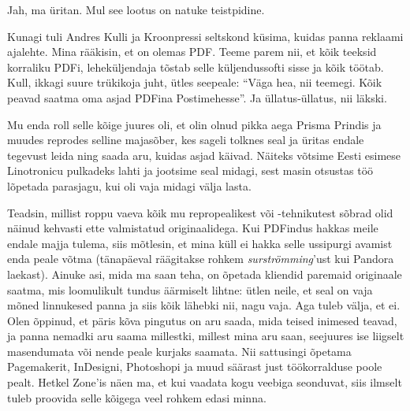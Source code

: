 Jah, ma üritan. Mul see lootus on natuke teistpidine. 

Kunagi tuli Andres Kulli ja Kroonpressi 
seltskond küsima, kuidas panna reklaami ajalehte. Mina rääkisin, et on 
olemas PDF. Teeme parem nii, et kõik teeksid korraliku PDFi, leheküljendaja 
tõstab selle küljendussofti sisse ja kõik töötab. Kull, ikkagi
suure trükikoja juht, ütles seepeale: \enquote{Väga hea, nii teemegi. 
Kõik peavad saatma oma asjad PDFina Postimehesse}. Ja üllatus-üllatus, nii läkski. 

Mu enda roll selle kõige juures oli, et olin olnud pikka aega Prisma Prindis ja 
muudes reprodes selline majasõber, kes sageli tolknes seal ja üritas endale 
tegevust leida ning saada aru, kuidas asjad käivad. Näiteks võtsime
Eesti esimese Linotronicu pulkadeks lahti ja jootsime seal midagi, sest masin otsustas töö lõpetada parasjagu, kui oli vaja midagi välja 
lasta. 

Teadsin, millist roppu vaeva kõik mu repropealikest või -tehnikutest sõbrad olid näinud kehvasti ette valmistatud 
originaalidega. Kui PDFindus hakkas meile endale majja tulema, siis 
mõtlesin, et mina küll ei hakka selle ussipurgi avamist enda peale võtma
(tänapäeval räägitakse rohkem \emph{surströmming}'ust kui Pandora laekast). Ainuke 
asi, mida ma saan teha, on õpetada kliendid paremaid originaale saatma, mis 
loomulikult tundus äärmiselt lihtne:
ütlen neile, et seal on vaja mõned linnukesed panna ja siis kõik 
lähebki nii, nagu vaja. Aga tuleb välja, et ei. Olen õppinud, et päris 
kõva pingutus on aru saada, mida teised inimesed teavad, ja 
panna nemadki aru saama millestki, millest mina aru saan, 
seejuures ise liigselt masendumata või 
nende peale kurjaks saamata. Nii sattusingi õpetama Pagemakerit, 
InDesigni, Photoshopi ja muud säärast just töökorralduse poole 
pealt. Hetkel Zone'is näen ma, et kui vaadata kogu veebiga 
seonduvat, siis ilmselt tuleb proovida selle kõigega veel rohkem edasi minna. 